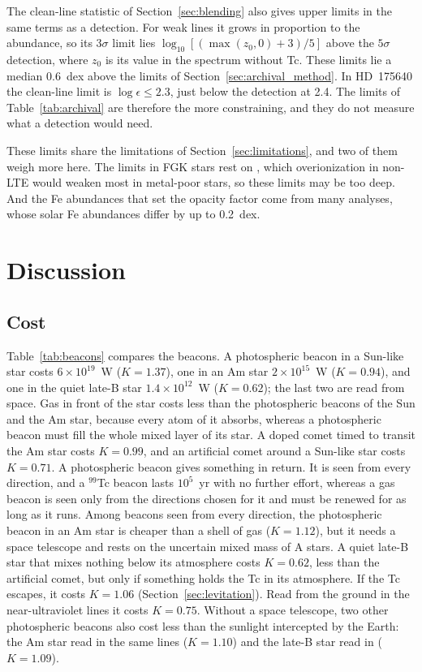 \documentclass[final,5p]{elsarticle}
\begin{document}
The clean-line statistic of Section~\ref{sec:blending} also gives upper limits in the same terms as a detection. For weak lines it grows in proportion to the abundance, so its $3\sigma$ limit lies $\log_{10}[(\max(z_0, 0) + 3)/5]$ above the $5\sigma$ detection, where $z_0$ is its value in the spectrum without Tc. These limits lie a median 0.6~dex above the limits of Section~\ref{sec:archival_method}. In HD~175640 the clean-line limit is $\log\epsilon \leq 2.3$, just below the detection at 2.4. The limits of Table~\ref{tab:archival} are therefore the more constraining, and they do not measure what a detection would need.

These limits share the limitations of Section~\ref{sec:limitations}, and two of them weigh more here. The limits in FGK stars rest on , which overionization in non-LTE would weaken most in metal-poor stars, so these limits may be too deep. And the Fe abundances that set the opacity factor come from many analyses, whose solar Fe abundances differ by up to 0.2~dex.

\section{Discussion}
\label{sec:discussion}

\subsection{Cost}
\label{sec:cost}

Table~\ref{tab:beacons} compares the beacons. A photospheric beacon in a Sun-like star costs $6\times10^{19}$~W ($K = 1.37$), one in an Am star $2\times10^{15}$~W ($K = 0.94$), and one in the quiet late-B star $1.4\times10^{12}$~W ($K = 0.62$); the last two are read from space. Gas in front of the star costs less than the photospheric beacons of the Sun and the Am star, because every atom of it absorbs, whereas a photospheric beacon must fill the whole mixed layer of its star. A doped comet timed to transit the Am star costs $K = 0.99$, and an artificial comet around a Sun-like star costs $K = 0.71$. A photospheric beacon gives something in return. It is seen from every direction, and a $^{99}$Tc beacon lasts $10^{5}$~yr with no further effort, whereas a gas beacon is seen only from the directions chosen for it and must be renewed for as long as it runs. Among beacons seen from every direction, the photospheric beacon in an Am star is cheaper than a shell of gas ($K = 1.12$), but it needs a space telescope and rests on the uncertain mixed mass of A stars. A quiet late-B star that mixes nothing below its atmosphere costs $K = 0.62$, less than the artificial comet, but only if something holds the Tc in its atmosphere. If the Tc escapes, it costs $K = 1.06$ (Section~\ref{sec:levitation}). Read from the ground in the near-ultraviolet  lines it costs $K = 0.75$. Without a space telescope, two other photospheric beacons also cost less than the sunlight intercepted by the Earth: the Am star read in the same lines ($K = 1.10$) and the late-B star read in  ($K = 1.09$).
\end{document}
